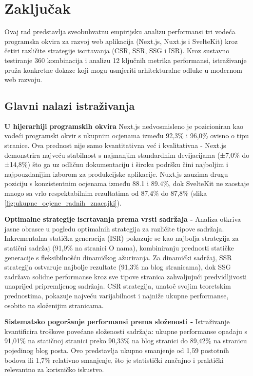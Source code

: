 \section{Zaključak}

Ovaj rad predstavlja sveobuhvatnu empirijsku analizu performansi tri vodeća programska okvira za razvoj web aplikacija (Next.js, Nuxt.js i SvelteKit) kroz četiri različite strategije iscrtavanja (CSR, SSR, SSG i ISR). Kroz sustavno testiranje 360 kombinacija i analizu 12 ključnih metrika performansi, istraživanje pruža konkretne dokaze koji mogu usmjeriti arhitekturalne odluke u modernom web razvoju.

\subsection{Glavni nalazi istraživanja}

\textbf{U hijerarhiji programskih okvira} Next.js nedvosmisleno je pozicioniran kao vodeći programski okvir s ukupnim ocjenama između 92,3\% i 96,0\% ovisno o tipu stranice. Ova prednost nije samo kvantitativna već i kvalitativna - Next.js demonstrira najveću stabilnost s najmanjim standardnim devijacijama (±7,0\% do ±14,8\%) što ga uz odličnu dokumentaciju i široku podršku čini najboljim i najpouzdanijim izborom za produkcijske aplikacije. Nuxt.js zauzima drugu poziciju s konzistentnim ocjenama između 88.1 i 89.4\%, dok SvelteKit ne zaostaje mnogo sa vrlo respektabilnim rezultatima od 87,4\% do 87,8\% (slika \ref{fig:ukupne_ocjene_radnih_znacajki}).

\textbf{Optimalne strategije iscrtavanja prema vrsti sadržaja -} Analiza otkriva jasne obrasce u pogledu optimalnih strategija za različite tipove sadržaja. Inkrementalna statička generacija (ISR) pokazuje se kao najbolja strategija za statični sadržaj (91,9\% na stranici O nama), kombiniranju prednosti statičke generacije s fleksibilnošću dinamičkog ažuriranja. Za dinamički sadržaj, SSR strategija ostvaruje najbolje rezultate (91,3\% na blog stranicama), dok SSG zadržava solidne performanse kroz sve tipove stranica zahvaljujući predvidljivosti unaprijed pripremljenog sadržaja. CSR strategija, unatoč svojim teoretskim prednostima, pokazuje najveću varijabilnost i najniže ukupne performanse, osobito na složenijim stranicama.

\textbf{Sistematsko pogoršanje performansi prema složenosti -} Istraživanje kvantificira troškove povećane složenosti sadržaja: ukupne performanse opadaju s 91,01\% na statičnoj stranici preko 90,33\% na blog stranici do 89,42\% na stranicu pojedinog blog posta. Ovo predstavlja ukupno smanjenje od 1,59 postotnih bodova ili 1,7\% relativno smanjenje, što je statistički značajno i praktički relevantno za korisničko iskustvo.

